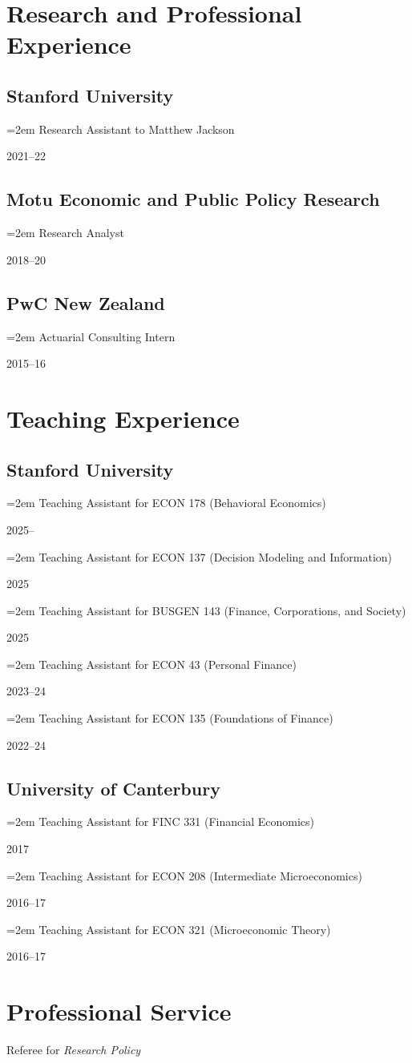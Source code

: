 \documentclass[11pt,oneside]{memoir}
\newcommand{\entry}[1]{\par\parbox[t]{\hsize}{\strut\raggedright #1}}
\newcommand{\datedentry}[2]{\par\parbox[t]{0.9\hsize}{\strut\raggedright\hangindent=2em #2\strut}\hfill#1}
\begin{document}
\section{Research and Professional Experience}

\subsection{Stanford University}
\datedentry{2021--22}{Research Assistant to Matthew Jackson}

\subsection{Motu Economic and Public Policy Research}
\datedentry{2018--20}{Research Analyst}

\subsection{PwC New Zealand}
\datedentry{2015--16}{Actuarial Consulting Intern}

\section{Teaching Experience}

\subsection{Stanford University}
\datedentry{2025--}{Teaching Assistant for ECON 178 (Behavioral Economics)}
\datedentry{2025}{Teaching Assistant for ECON 137 (Decision Modeling and Information)}
\datedentry{2025}{Teaching Assistant for BUSGEN 143 (Finance, Corporations, and Society)}
\datedentry{2023--24}{Teaching Assistant for ECON 43 (Personal Finance)}
\datedentry{2022--24}{Teaching Assistant for ECON 135 (Foundations of Finance)}

\subsection{University of Canterbury}
\datedentry{2017}{Teaching Assistant for FINC 331 (Financial Economics)}
\datedentry{2016--17}{Teaching Assistant for ECON 208 (Intermediate Microeconomics)}
\datedentry{2016--17}{Teaching Assistant for ECON 321 (Microeconomic Theory)}

\section{Professional Service}
\entry{Referee for \emph{Research Policy}}
\end{document}
